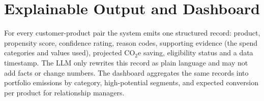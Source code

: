 \documentclass[11pt,a4paper]{article}
\begin{document}
\section{Explainable Output and Dashboard}
For every customer-product pair the system emits one structured record: product, propensity score, confidence rating, reason codes, supporting evidence (the spend categories and values used), projected CO$_2$e saving, eligibility status and a data timestamp. The LLM only rewrites this record as plain language and may not add facts or change numbers. The dashboard aggregates the same records into portfolio emissions by category, high-potential segments, and expected conversion per product for relationship managers.
\end{document}
